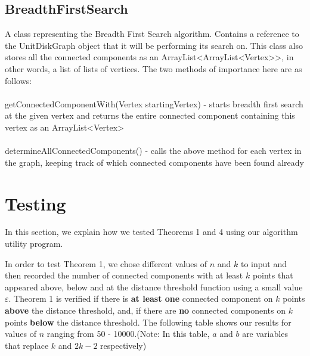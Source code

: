 \documentclass{article}
\begin{document}
\subsection*{BreadthFirstSearch}
A class representing the Breadth First Search algorithm. Contains a reference to the UnitDiskGraph object that it will be performing its search on. This class also stores all the connected components as an ArrayList\textless ArrayList\textless Vertex\textgreater\textgreater, in other words, a list of lists of vertices. The two methods of importance here are as follows:\\ \\
getConnectedComponentWith(Vertex startingVertex) - starts breadth first search at the given vertex and returns the entire connected component containing this vertex as an ArrayList\textless Vertex\textgreater \\ \\
determineAllConnectedComponents() - calls the above method for each vertex in the graph, keeping track of which connected components have been found already


\section{Testing}
In this section, we explain how we tested Theorems 1 and 4 using our algorithm utility program.

In order to test Theorem 1, we chose different values of $n$ and $k$ to input and then recorded the number of connected components with at least $k$ points that appeared above, below and at the distance threshold function using a small value $\varepsilon$. Theorem 1 is verified if there is \textbf{at least one} connected component on $k$ points \textbf{above} the distance threshold, and, if there are \textbf{no} connected components on $k$ points \textbf{below} the distance threshold. The following table shows our results for values of $n$ ranging from 50 - 10000.(Note: In this table, $a$ and $b$ are variables that replace $k$ and $2k-2$ respectively)
\end{document}
